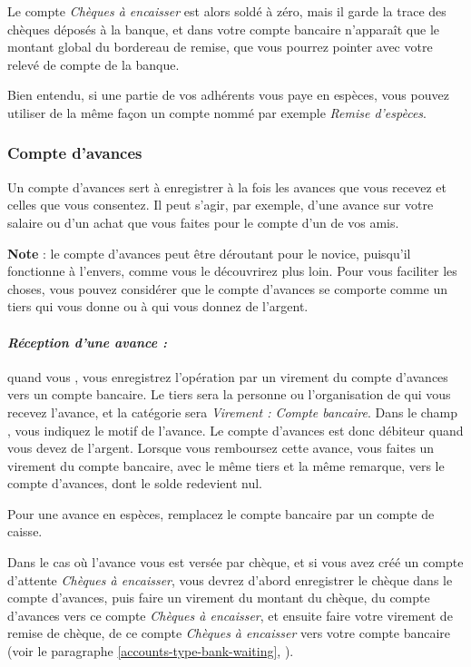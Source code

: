 Le compte \emph{Chèques à encaisser} est alors soldé à zéro, mais il garde la trace des chèques déposés à la banque, et dans votre compte bancaire n'apparaît que le montant global du bordereau de remise, que vous pourrez pointer avec votre relevé de compte de la banque.

Bien entendu, si une partie de vos adhérents vous paye en espèces, vous pouvez utiliser de la même façon un compte nommé par exemple \emph{Remise d'espèces}.


\subsubsection{Compte d'avances\label{accounts-type-bank-advance}}

Un compte d'avances sert à enregistrer à la fois les avances que vous recevez et celles que vous consentez. Il peut s'agir, par exemple, d'une avance sur votre salaire ou d'un achat que vous faites pour le compte d'un de vos amis.

\textbf{Note} : le compte d'avances peut être déroutant pour le novice, puisqu'il fonctionne à l'envers, comme vous le découvrirez plus loin. Pour vous faciliter les choses, vous pouvez considérer que le compte d'avances se comporte comme un tiers qui vous donne ou à qui vous donnez de l'argent.

\paragraph{\textsl{Réception d'une avance  :}} quand vous , vous enregistrez l'opération par un virement du compte d'avances vers un compte bancaire. Le tiers sera la personne ou l'organisation de qui vous recevez l'avance, et la catégorie sera \emph{Virement : Compte bancaire}. Dans le champ , vous indiquez le motif de l'avance. Le compte d'avances est donc débiteur quand vous devez de l'argent. Lorsque vous remboursez cette avance, vous faites un virement du compte bancaire, avec le même tiers et la même remarque, vers le compte d'avances, dont le solde redevient nul.

Pour une avance en espèces, remplacez le compte bancaire par un compte de caisse.

Dans le cas où l'avance vous est versée par chèque, et si vous avez créé un compte d'attente \emph{Chèques à encaisser}, vous devrez d'abord enregistrer le chèque dans le compte d'avances, puis faire un virement du montant du chèque, du compte d'avances vers ce compte \emph{Chèques à encaisser}, et ensuite faire votre virement de remise de chèque, de ce compte \emph{Chèques à encaisser} vers votre compte bancaire (voir le paragraphe \vref{accounts-type-bank-waiting}, ). 


